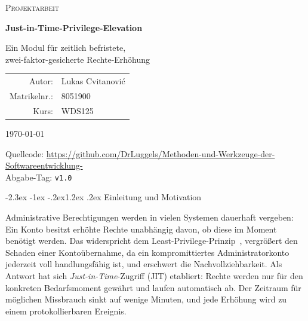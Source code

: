\documentclass[11pt,a4paper]{article}
\makeatletter
\renewcommand\section{\@startsection{section}{1}{\z@}%
  {-2.3ex \@plus -1ex \@minus -.2ex}{1.2ex \@plus .2ex}%
  {\normalfont\Large\bfseries}}
\makeatother
\begin{document}
\begin{titlepage}
  \centering
  {\scshape Projektarbeit\par}
  \vfill
  {\Huge\bfseries Just-in-Time-Privilege-Elevation\par}
  \vspace{0.8cm}
  {\Large Ein Modul für zeitlich befristete,\\[0.2em]
   zwei-faktor-gesicherte Rechte-Erhöhung\par}
  \vfill
  \begin{tabular}{rl}
    Autor:        & Lukas Cvitanović \\
    Matrikelnr.:  & 8051900 \\
    Kurs:         & WDS125 \\
  \end{tabular}
  \vspace{1.5cm}

  {\large \today\par}
  \vspace{0.6cm}
  {\small Quellcode:
   \url{https://github.com/DrLuggels/Methoden-und-Werkzeuge-der-Softwareentwicklung-}\\[0.3em]
   Abgabe-Tag: \texttt{v1.0}\par}
\end{titlepage}

\tableofcontents
\clearpage

\section{Einleitung und Motivation}

Administrative Berechtigungen werden in vielen Systemen dauerhaft vergeben:
Ein Konto besitzt erhöhte Rechte unabhängig davon, ob diese im Moment benötigt
werden. Das widerspricht dem Least-Privilege-Prinzip~\cite{owasp_polp}, vergrößert
den Schaden einer Kontoübernahme, da ein kompromittiertes Administratorkonto jederzeit
voll handlungsfähig ist, und erschwert die Nachvollziehbarkeit. Als Antwort hat
sich \emph{Just-in-Time}-Zugriff (JIT) etabliert: Rechte werden nur für den
konkreten Bedarfsmoment gewährt und laufen automatisch ab. Der Zeitraum für
möglichen Missbrauch sinkt auf wenige Minuten, und jede Erhöhung wird zu einem
protokollierbaren Ereignis.
\end{document}

